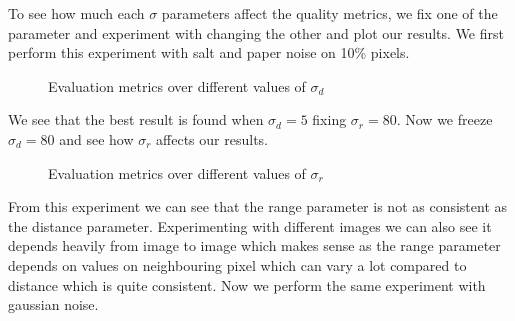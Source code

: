 \documentclass[a4paper, english]{article}
\begin{document}
To see how much each $\sigma$ parameters affect the quality metrics, we fix one of the parameter and experiment with changing the other and plot our results. We first perform this experiment with salt and paper noise on 10\% pixels.

\begin{figure}[H]
\centering
    \caption{Evaluation metrics over different values of $\sigma_d$}
\end{figure}

We see that the best result is found when $\sigma_d = 5$ fixing $\sigma_r = 80$. Now we freeze $\sigma_d = 80$ and see how $\sigma_r$ affects our results.

\begin{figure}[H]
\centering
    \caption{Evaluation metrics over different values of $\sigma_r$}
\end{figure}

From this experiment we can see that the range parameter is not as consistent as the distance parameter. Experimenting with different images we can also see it depends heavily from image to image which makes sense as the range parameter depends on values on neighbouring pixel which can vary a lot compared to distance which is quite consistent. Now we perform the same experiment with gaussian noise.
\end{document}
